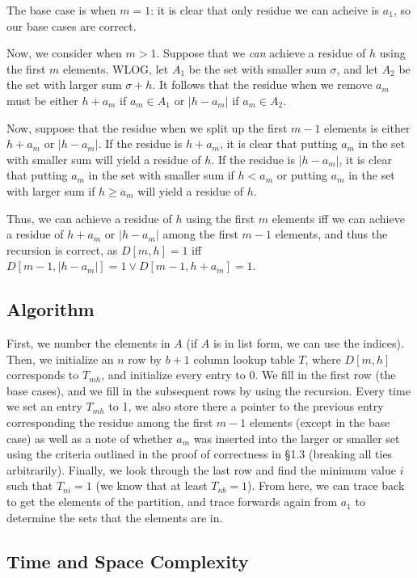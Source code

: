 \documentclass[10pt,letter]{article}
\begin{document}
The base case is when $m = 1$: it is clear that only residue we can acheive is $a_1$, so our base cases are correct.

Now, we consider when $m > 1$. Suppose that we \textit{can} achieve a residue of $h$ using the first $m$ elements. WLOG, let $A_1$ be the set with smaller sum $\sigma$, and let $A_2$ be the set with larger sum $\sigma + h$. It follows that the residue when we remove $a_m$ must be either $h + a_m$ if $a_m \in A_1$ or $\vert h - a_m \vert$ if $a_m \in A_2$.

Now, suppose that the residue when we split up the first $m - 1$ elements is either $h + a_m$ or $\vert h - a_m \vert$. If the residue is $h + a_m$, it is clear that putting $a_m$ in the set with smaller sum will yield a residue of $h$. If the residue is $\vert h - a_m \vert$, it is clear that putting $a_m$ in the set with smaller sum if $h < a_m$ or putting $a_m$ in the set with larger sum if $h \geq a_m$ will yield a residue of $h$.

Thus, we can achieve a residue of $h$ using the first $m$ elements iff we can achieve a residue of $h + a_m$ or $\vert h - a_m \vert$ among the first $m - 1$ elements, and thus the recursion is correct, as $D[m, h] = 1$ iff $D[m - 1, \vert h - a_m \vert] = 1 \lor  D[m - 1, h + a_m] = 1$.

\subsection{Algorithm}

First, we number the elements in $A$ (if $A$ is in list form, we can use the indices). Then, we initialize an $n$ row by $b+1$ column lookup table $T$, where $D[m, h]$ corresponds to $T_{mh}$, and initialize every entry to 0. We fill in the first row (the base cases), and we fill in the subsequent rows by using the recursion. Every time we set an entry $T_{mh}$ to 1, we also store there a pointer to the previous entry corresponding the residue among the first $m - 1$ elements (except in the base case) as well as a note of whether $a_m$ was inserted into the larger or smaller set using the criteria outlined in the proof of correctness in \S 1.3 (breaking all ties arbitrarily). Finally, we look through the last row and find the minimum value $i$ such that $T_{ni} = 1$ (we know that at least $T_{nb} = 1$). From here, we can trace back to get the elements of the partition, and trace forwards again from $a_1$ to determine the sets that the elements are in. 

\subsection{Time and Space Complexity}
\end{document}
